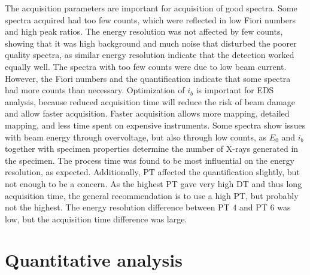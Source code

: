 The acquisition parameters are important for acquisition of good spectra.
Some spectra acquired had too few counts, which were reflected in low Fiori numbers and high peak ratios.
The energy resolution was not affected by few counts, showing that it was high background and much noise that disturbed the poorer quality spectra, as similar energy resolution indicate that the detection worked equally well.
The spectra with too few counts were due to low beam current.
However, the Fiori numbers and the quantification indicate that some spectra had more counts than necessary.
Optimization of $i_b$ is important for EDS analysis, because reduced acquisition time will reduce the risk of beam damage and allow faster acquisition.
Faster acquisition allows more mapping, detailed mapping, and less time spent on expensive instruments.
Some spectra show issues with beam energy through overvoltage, but also through low counts, as  $E_0$ and $i_b$ together with specimen properties determine the number of X-rays generated in the specimen.
The process time was found to be most influential on the energy resolution, as expected.
Additionally, PT affected the quantification slightly, but not enough to be a concern.
As the highest PT gave very high DT and thus long acquisition time, the general recommendation is to use a high PT, but probably not the highest.
The energy resolution difference between PT $4$ and PT $6$ was low, but the acquisition time difference was large.


\clearpage




























\section{Quantitative analysis}
\label{discussion:quantitative}


